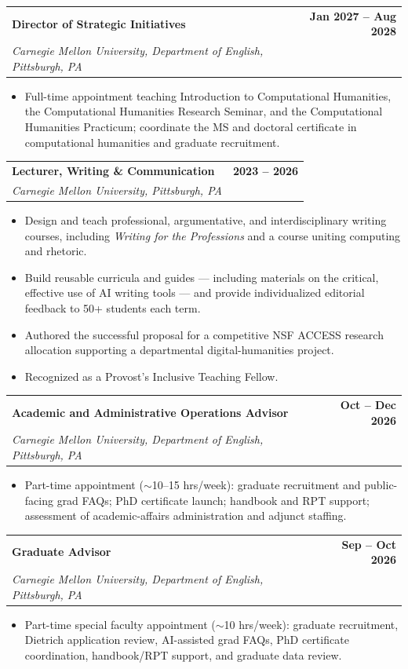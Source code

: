 \documentclass[11pt,letterpaper]{article}
\makeatletter
\newcommand{\entry}[4]{%
  \noindent\begin{tabularx}{\linewidth}{@{}X r@{}}
    \textbf{#1} & \textbf{#4}\\
    \textit{#2, #3} & \\
  \end{tabularx}\vspace{1pt}}
\makeatother
\begin{document}
\entry{Director of Strategic Initiatives}{Carnegie Mellon University, Department of English}{Pittsburgh, PA}{Jan 2027 -- Aug 2028}
\begin{itemize}
  \item Full-time appointment teaching Introduction to Computational Humanities, the Computational Humanities Research Seminar, and the Computational Humanities Practicum; coordinate the MS and doctoral certificate in computational humanities and graduate recruitment.
\end{itemize}
\vspace{5pt}

\entry{Lecturer, Writing \& Communication}{Carnegie Mellon University}{Pittsburgh, PA}{2023 -- 2026}
\begin{itemize}
  \item Design and teach professional, argumentative, and interdisciplinary writing courses, including \textit{Writing for the Professions} and a course uniting computing and rhetoric.
  \item Build reusable curricula and guides --- including materials on the critical, effective use of AI writing tools --- and provide individualized editorial feedback to 50+ students each term.
  \item Authored the successful proposal for a competitive NSF ACCESS research allocation supporting a departmental digital-humanities project.
  \item Recognized as a Provost's Inclusive Teaching Fellow.
\end{itemize}
\vspace{5pt}

\entry{Academic and Administrative Operations Advisor}{Carnegie Mellon University, Department of English}{Pittsburgh, PA}{Oct -- Dec 2026}
\begin{itemize}
  \item Part-time appointment ($\sim$10--15 hrs/week): graduate recruitment and public-facing grad FAQs; PhD certificate launch; handbook and RPT support; assessment of academic-affairs administration and adjunct staffing.
\end{itemize}
\vspace{5pt}

\entry{Graduate Advisor}{Carnegie Mellon University, Department of English}{Pittsburgh, PA}{Sep -- Oct 2026}
\begin{itemize}
  \item Part-time special faculty appointment ($\sim$10 hrs/week): graduate recruitment, Dietrich application review, AI-assisted grad FAQs, PhD certificate coordination, handbook/RPT support, and graduate data review.
\end{itemize}
\vspace{5pt}
\end{document}
